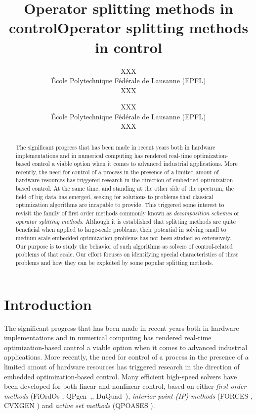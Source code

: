 \documentclass[openany]{now}
\title{Operator splitting methods in control}
\author{
XXX \\
\'Ecole Polytechnique F\'ed\'erale de Lausanne (EPFL) \\
XXX
\and
XXX \\
\'Ecole Polytechnique F\'ed\'erale de Lausanne (EPFL) \\
XXX
}
\begin{document}
\copyrightowner{}
\frontmatter
\maketitle
\tableofcontents
\mainmatter
\begin{abstract}
The significant progress that has been made in recent years both in hardware implementations and in numerical computing has rendered real-time optimization-based control a viable option when it comes to advanced industrial applications. More recently, the need for control of a process in the presence of a limited amout of hardware resources has triggered research in the direction of embedded optimization-based control. At the same time, and standing at the other side of the spectrum, the field of big data has emerged, seeking for solutions to problems that classical optimization algorithms are incapable to provide. This triggered some interest to revisit the family of first order methods commonly known as \emph{decomposition schemes} or \emph{operator splitting methods}. Although it is established that splitting methods are quite beneficial when applied to large-scale problems, their potential in solving small to medium scale embedded optimization problems has not been studied so extensively. Our purpose is to study the behavior of such algorithms as solvers of control-related problems of that scale. Our effort focuses on identifying special characteristics of these problems and how they can be exploited by some popular splitting methods. 
\end{abstract}




\title{Operator splitting methods in control}








\chapter{Introduction}

The significant progress that has been made in recent years both in hardware implementations and in numerical computing has rendered real-time optimization-based control a viable option when it comes to advanced industrial applications. More recently, the need for control of a process in the presence of a limited amout of hardware resources has triggered research in the direction of embedded optimization-based control. Many efficient high-speed solvers have been developed for both linear and nonlinear control, based on either \emph{first order methods} (FiOrdOs \cite{FiOrdOs}, QPgen~\cite{giselsson2014metric},\cite{Giselsson:fbds}, DuQuad~\cite{necoara2015duquad}), \emph{interior point (IP) methods} (FORCES \cite{FORCES}, CVXGEN \cite{CVXGEN}) and \emph{active set methods} (QPOASES \cite{qpOASES}).\\
\end{document}
